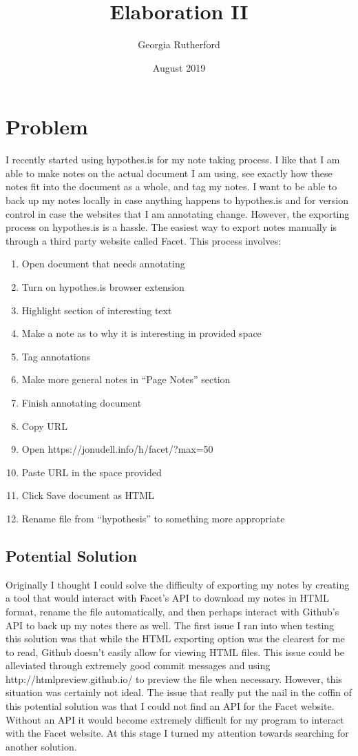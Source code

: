 \documentclass{article}
\title{Elaboration II}
\author{Georgia Rutherford}
\date{August 2019}
\begin{document}
\maketitle

\section{Problem}
I recently started using hypothes.is for my note taking process. I like that I am able to make notes on the actual document I am using, see exactly how these notes fit into the document as a whole, and tag my notes. I want to be able to back up my notes locally in case anything happens to hypothes.is and for version control in case the websites that I am annotating change. However, the exporting process on hypothes.is is a hassle. 
\newline
The easiest way to export notes manually is through a third party website called Facet. This process involves:
\begin{enumerate}
\item Open document that needs annotating
\item Turn on hypothes.is browser extension
\item Highlight section of interesting text
\item Make a note as to why it is interesting in provided space
\item Tag annotations 
\item Make more general notes in “Page Notes” section
\item Finish annotating document
\item Copy URL
\item Open https://jonudell.info/h/facet/?max=50
\item Paste URL in the space provided
\item Click Save document as HTML
\item Rename file from “hypothesis” to something more appropriate
\end{enumerate}

\subsection{Potential Solution}
Originally I thought I could solve the difficulty of exporting my notes by creating a tool that would interact with Facet's API to download my notes in HTML format, rename the file automatically, and then perhaps interact with Github's API to back up my notes there as well. The first issue I ran into when testing this solution was that while the HTML exporting option was the clearest for me to read, Github doesn't easily allow for viewing HTML files. This issue could be alleviated through extremely good commit messages and using http://htmlpreview.github.io/  to preview the file when necessary. However, this situation was certainly not ideal. The issue that really put the nail in the coffin of this potential solution was that I could not find an API for the Facet website. Without an API it would become extremely difficult for my program to interact with the Facet website. At this stage I turned my attention towards searching for another solution.
\end{document}
